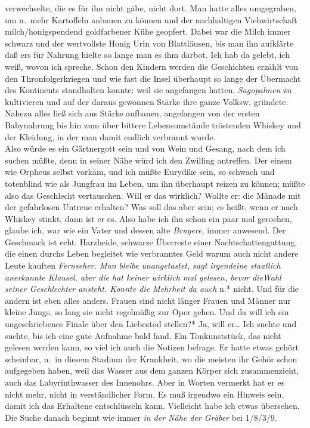 \documentclass[
]{article}
\begin{document}
verwechselte, die es für ihn nicht gäbe, nicht dort. Man hatte alles
umgegraben, um n.~mehr Kartoffeln anbauen zu können und der nachhaltigen
Viehwirtschaft milch/honigspendend goldfarbener Kühe geopfert. Dabei war
die Milch immer schwarz und der wertvollste Honig Urin von Blattläusen,
bis man ihn aufklärte daß ers für Nahrung hielte so lange man es ihm
darbot. Ich hab da gelebt, ich weiß, wovon ich spreche. Schon den
Kindern werden die Geschichten erzählt von den Thronfolgerkriegen und
wie fast die Insel überhaupt so lange der Übermacht des Kontinents
standhalten konnte: weil sie angefangen hatten, \emph{Sagopalmen} zu
kultivieren und auf der daraus gewonnen Stärke ihre ganze Volksw.
gründete. Nahezu alles ließ sich aus Stärke aufbauen, angefangen von der
ersten Babynahrung bis hin zum über bittere Lebensumstände tröstenden
Whiskey und der Kleidung, in der man damit endlich verbrannt wurde.\\
Also würde es ein Gärtnergott sein und von Wein und Gesang, nach dem ich
suchen müßte, denn in seiner Nähe würd ich den Zwilling antreffen. Der
einem wie Orpheus selbst vorkäm, und ich müßte Eurydike sein, so schwach
und totenblind wie als Jungfrau im Leben, um ihn überhaupt reizen zu
können; müßte also das Geschlecht vertauschen. Will er das wirklich?
Wollte er: die Mänade mit der gefahrlosen Untreue erhalten? Was soll das
aber sein; es heißt, wenn er nach Whiskey stinkt, dann ist er es. Also
habe ich ihn schon ein paar mal gerochen, glaube ich, war wie ein Vater
und dessen alte \emph{Bruyere,} immer anwesend. Der Geschmack ist echt.
Harzheide, schwarze Überreste einer Nachtschattengattung, die einen
durchs Leben begleitet wie verbranntes Geld warum auch nicht andere
Leute kauften \emph{Fernseher. Man bleibe unangetastet, sagt irgendeine
staatlich anerkannte Klausel, aber die hat keiner wirklich mal gelesen,
bevor dieWahl seiner Geschlechter ansteht. Konnte die Mehrheit da auch
}n.* nicht. Und für die andern ist eben alles anders. Frauen sind nicht
länger Frauen und Männer nur kleine Jungs, so lang sie nicht regelmäßig
zur Oper gehen. Und da will ich ein ungeschriebenes Finale über den
Liebestod stellen?* Ja, will er\ldots{} Ich suchte und suchte, bis ich
eine gute Aufnahme bald fand. Ein Tonkunststück, das nicht gelesen
werden kann, so viel ich auch die Notizen befrage. Er hatte etwas gehört
scheinbar, n.~in diesem Stadium der Krankheit, wo die meisten ihr Gehör
schon aufgegeben haben, weil das Wasser aus dem ganzen Körper sich
zusammenzieht, auch das Labyrinthwasser des Innenohrs. Aber in Worten
vermerkt hat er es nicht mehr, nicht in verständlicher Form. Es muß
irgendwo ein Hinweis sein, damit ich das Erhaltene entschlüsseln kann.
Vielleicht habe ich etwas übersehen. Die Suche danach beginnt wie immer
\emph{in der Nähe der Gräber} bei 1/8/3/9.
\end{document}
